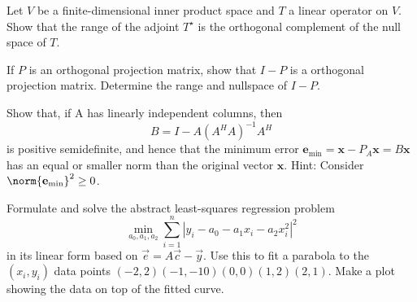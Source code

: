 \documentclass[11pt]{article}
\begin{document}
\makeAssignmentTitle

\begin{homeworkProblem}

    Let $V$ be a finite-dimensional inner product space and $T$ a linear operator on $V$. Show that
    the range of the adjoint $T^\star$ is the orthogonal complement of the null space of $T$. \\

    \solution

\end{homeworkProblem}

\pagebreak

\begin{homeworkProblem}

    If $P$ is an orthogonal projection matrix, show that $I - P$ is a orthogonal projection matrix.
    Determine the range and nullspace of $I - P$. \\

    \solution

\end{homeworkProblem}

\pagebreak

\begin{homeworkProblem}

    Show that, if A has linearly independent columns, then
    \[
        B = I - A(A^H A)^{-1} A^H
    \]
    is positive semidefinite, and hence that the minimum error $\mathbf{e}_\text{min} = \mathbf{x} - P_A \mathbf{x} = B \mathbf{x}$ has an
    equal or smaller norm than the original vector $\mathbf{x}$. Hint: Consider $\norm{\mathbf{e}_\text{min}}^2 \geq 0$. \\

    \solution

\end{homeworkProblem}

\pagebreak

\begin{homeworkProblem}

    Formulate and solve the abstract least-squares regression problem
    \[
        \min_{a_0, a_1, a_2} \sum_{i=1}^{n} |y_i - a_0 - a_1 x_i - a_2 x_i^2 |^2
    \]
    in its linear form based on $\vec{e} = A\vec{c} - \vec{y}$. Use this to fit a parabola to the $(x_i, y_i)$ data points
    $(-2, 2)(-1, -10)(0, 0)(1, 2)(2, 1)$. Make a plot showing the data on top of the fitted curve. \\

    \solution

\end{homeworkProblem}
\end{document}
